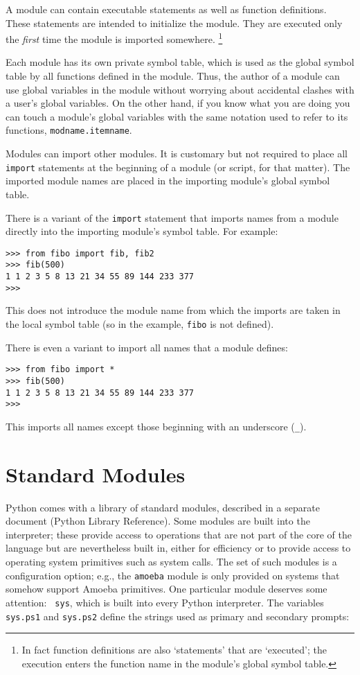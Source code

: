 A module can contain executable statements as well as function
definitions.
These statements are intended to initialize the module.
They are executed only the
{\em first}
time the module is imported somewhere.%
\footnote{
	In fact function definitions are also `statements' that are
	`executed'; the execution enters the function name in the
	module's global symbol table.
}

Each module has its own private symbol table, which is used as the
global symbol table by all functions defined in the module.
Thus, the author of a module can use global variables in the module
without worrying about accidental clashes with a user's global
variables.
On the other hand, if you know what you are doing you can touch a
module's global variables with the same notation used to refer to its
functions,
{\tt modname.itemname}.

Modules can import other modules.
It is customary but not required to place all
{\tt import}
statements at the beginning of a module (or script, for that matter).
The imported module names are placed in the importing module's global
symbol table.

There is a variant of the
{\tt import}
statement that imports names from a module directly into the importing
module's symbol table.
For example:

\bcode\begin{verbatim}
>>> from fibo import fib, fib2
>>> fib(500)
1 1 2 3 5 8 13 21 34 55 89 144 233 377
>>> 
\end{verbatim}\ecode
%
This does not introduce the module name from which the imports are taken
in the local symbol table (so in the example, {\tt fibo} is not
defined).

There is even a variant to import all names that a module defines:

\bcode\begin{verbatim}
>>> from fibo import *
>>> fib(500)
1 1 2 3 5 8 13 21 34 55 89 144 233 377
>>> 
\end{verbatim}\ecode
%
This imports all names except those beginning with an underscore
({\tt _}).

\section{Standard Modules}

Python comes with a library of standard modules, described in a separate
document (Python Library Reference).  Some modules are built into the
interpreter; these provide access to operations that are not part of the
core of the language but are nevertheless built in, either for
efficiency or to provide access to operating system primitives such as
system calls.  The set of such modules is a configuration option; e.g.,
the {\tt amoeba} module is only provided on systems that somehow support
Amoeba primitives.  One particular module deserves some attention: {\tt
sys}, which is built into every Python interpreter.  The variables {\tt
sys.ps1} and {\tt sys.ps2} define the strings used as primary and
secondary prompts:

